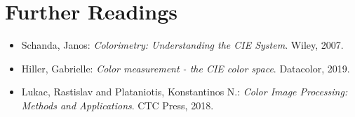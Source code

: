 {
    \label{Nano:TestRGBLEDApp}
}



\section{Further Readings}

\begin{itemize}
  \item  Schanda, Janos: \textsl{Colorimetry: Understanding the CIE System}. Wiley, 2007. \cite{schanda:2007}
   \item Hiller, Gabrielle: \textsl{Color measurement - the CIE color space}. Datacolor, 2019. \cite{hiller:2019}
   \item Lukac, Rastislav and Plataniotis, Konstantinos N.: \textsl{Color Image Processing: Methods and Applications}. CTC Press, 2018. \cite{lukac:2018}
\end{itemize}





